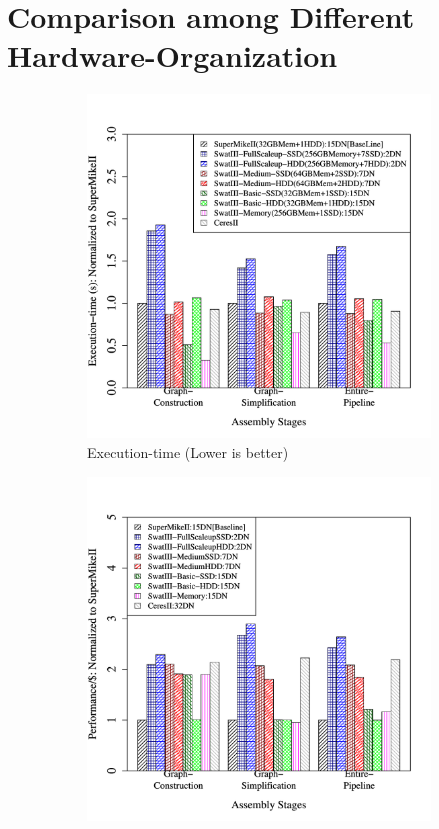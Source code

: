 \documentclass[conference]{IEEEtran}
\begin{document}
\section {Comparison among Different Hardware-Organization} \label{ComparingDifferentArchitecturalBalance}
\begin{figure}[htb]
        \begin{subfigure}[b]{0.5\textwidth}
                \includegraphics[width=\textwidth, height=.3\textheight]{Figure/PerormanceData/Plots/PerfDiffArch.pdf}
                \caption{Execution-time (Lower is better)}
                \label{fig:DifferentArchitecturesPerf}
        \end{subfigure}
        \begin{subfigure}[b]{0.5\textwidth}
                \includegraphics[width=\textwidth, height=.3\textheight]{Figure/PerormanceData/Plots/PerfPerDollarDiffArch.pdf}

\end{subfigure}
\end{figure}
\end{document}
